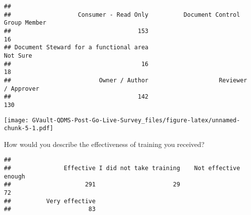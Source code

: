 \documentclass[
]{article}
\newenvironment{Shaded}{\begin{snugshade}}{\end{snugshade}}
\newcommand{\DataTypeTok}[1]{\textcolor[rgb]{0.13,0.29,0.53}{#1}}
\newcommand{\DecValTok}[1]{\textcolor[rgb]{0.00,0.00,0.81}{#1}}
\newcommand{\FloatTok}[1]{\textcolor[rgb]{0.00,0.00,0.81}{#1}}
\newcommand{\KeywordTok}[1]{\textcolor[rgb]{0.13,0.29,0.53}{\textbf{#1}}}
\newcommand{\NormalTok}[1]{#1}
\newcommand{\OperatorTok}[1]{\textcolor[rgb]{0.81,0.36,0.00}{\textbf{#1}}}
\newcommand{\StringTok}[1]{\textcolor[rgb]{0.31,0.60,0.02}{#1}}
\begin{document}
\begin{verbatim}
## 
##                   Consumer - Read Only          Document Control Group Member 
##                                    153                                     16 
## Document Steward for a functional area                               Not Sure 
##                                     16                                     18 
##                         Owner / Author                    Reviewer / Approver 
##                                    142                                    130
\end{verbatim}

\begin{Shaded}
\end{Shaded}

\texttt{[image: GVault-QDMS-Post-Go-Live-Survey\_files/figure-latex/unnamed-chunk-5-1.pdf]}

How would you describe the effectiveness of training you received?

\begin{Shaded}
\end{Shaded}

\begin{verbatim}
## 
##               Effective I did not take training    Not effective enough 
##                     291                      29                      72 
##          Very effective 
##                      83
\end{verbatim}

\begin{Shaded}
\end{Shaded}
\end{document}
